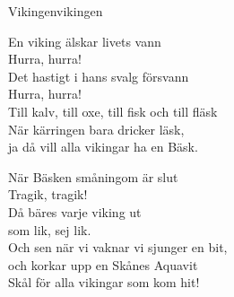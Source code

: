 \begin{song}{Vikingen}{vikingen}
\begin{vers}
En viking älskar livets vann\\
Hurra, hurra!\\
Det hastigt i hans svalg försvann\\
Hurra, hurra!\\
Till kalv, till oxe, till fisk och till fläsk\\
När kärringen bara dricker läsk,   \\
ja då vill alla vikingar ha en Bäsk.\\
\end{vers}
\begin{vers}
När Bäsken småningom är slut\\
Tragik, tragik! \\
Då bäres varje viking ut\\
som lik, sej lik.\\
Och sen när vi vaknar vi sjunger en bit,\\
och korkar upp en Skånes Aquavit\\
Skål för alla vikingar som kom hit!\\
\end{vers}
\end{song}
